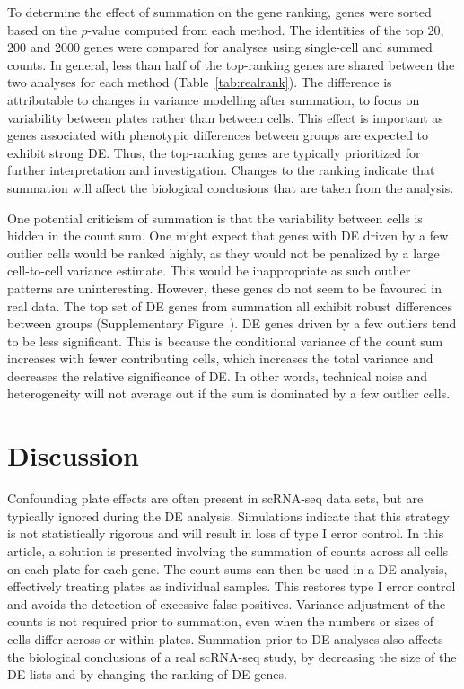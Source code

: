\documentclass[oupdraft]{bio}
\begin{document}
To determine the effect of summation on the gene ranking, genes were sorted based on the $p$-value computed from each method.
The identities of the top 20, 200 and 2000 genes were compared for analyses using single-cell and summed counts.
In general, less than half of the top-ranking genes are shared between the two analyses for each method (Table~\ref{tab:realrank}).
The difference is attributable to changes in variance modelling after summation, to focus on variability between plates rather than between cells.
This effect is important as genes associated with phenotypic differences between groups are expected to exhibit strong DE.
Thus, the top-ranking genes are typically prioritized for further interpretation and investigation.
Changes to the ranking indicate that summation will affect the biological conclusions that are taken from the analysis.

One potential criticism of summation is that the variability between cells is hidden in the count sum.
One might expect that genes with DE driven by a few outlier cells would be ranked highly, as they would not be penalized by a large cell-to-cell variance estimate.
This would be inappropriate as such outlier patterns are uninteresting.
However, these genes do not seem to be favoured in real data.
The top set of DE genes from summation all exhibit robust differences between groups (Supplementary Figure~\suppexpprof{}).
DE genes driven by a few outliers tend to be less significant.
This is because the conditional variance of the count sum increases with fewer contributing cells, 
    which increases the total variance and decreases the relative significance of DE.
In other words, technical noise and heterogeneity will not average out if the sum is dominated by a few outlier cells.


\section{Discussion}
Confounding plate effects are often present in scRNA-seq data sets, but are typically ignored during the DE analysis.
Simulations indicate that this strategy is not statistically rigorous and will result in loss of type I error control. 
In this article, a solution is presented involving the summation of counts across all cells on each plate for each gene.
The count sums can then be used in a DE analysis, effectively treating plates as individual samples.
This restores type I error control and avoids the detection of excessive false positives.
Variance adjustment of the counts is not required prior to summation, even when the numbers or sizes of cells differ across or within plates.
Summation prior to DE analyses also affects the biological conclusions of a real scRNA-seq study, 
    by decreasing the size of the DE lists and by changing the ranking of DE genes.
\end{document}
